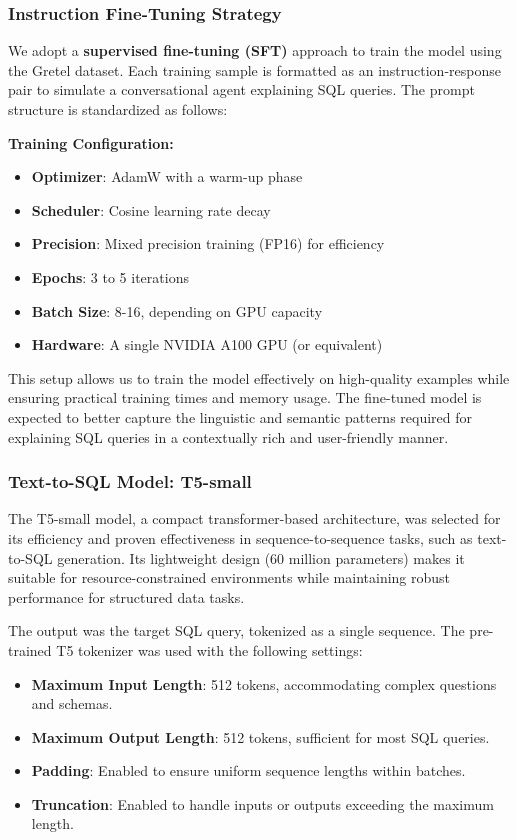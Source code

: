 \documentclass[11pt]{article}
\begin{document}
\subsubsection{Instruction Fine-Tuning Strategy}

We adopt a \textbf{supervised fine-tuning (SFT)} approach to train the model using the Gretel dataset. Each training sample is formatted as an instruction-response pair to simulate a conversational agent explaining SQL queries. The prompt structure is standardized as follows:


\textbf{Training Configuration:}
\begin{itemize}
  \item \textbf{Optimizer}: AdamW with a warm-up phase
  \item \textbf{Scheduler}: Cosine learning rate decay
  \item \textbf{Precision}: Mixed precision training (FP16) for efficiency
  \item \textbf{Epochs}: 3 to 5 iterations
  \item \textbf{Batch Size}: 8-16, depending on GPU capacity
  \item \textbf{Hardware}: A single NVIDIA A100 GPU (or equivalent)
\end{itemize}

This setup allows us to train the model effectively on high-quality examples while ensuring practical training times and memory usage. The fine-tuned model is expected to better capture the linguistic and semantic patterns required for explaining SQL queries in a contextually rich and user-friendly manner.

\subsubsection{Text-to-SQL Model: T5-small}

The T5-small model, a compact transformer-based architecture, was selected for its efficiency and proven effectiveness in sequence-to-sequence tasks, such as text-to-SQL generation. Its lightweight design (60 million parameters) makes it suitable for resource-constrained environments while maintaining robust performance for structured data tasks.

The output was the target SQL query, tokenized as a single sequence. The pre-trained T5 tokenizer was used with the following settings:

\begin{itemize}
    \item \textbf{Maximum Input Length}: 512 tokens, accommodating complex questions and schemas.
    \item \textbf{Maximum Output Length}: 512 tokens, sufficient for most SQL queries.
    \item \textbf{Padding}: Enabled to ensure uniform sequence lengths within batches.
    \item \textbf{Truncation}: Enabled to handle inputs or outputs exceeding the maximum length.
\end{itemize}
\end{document}
